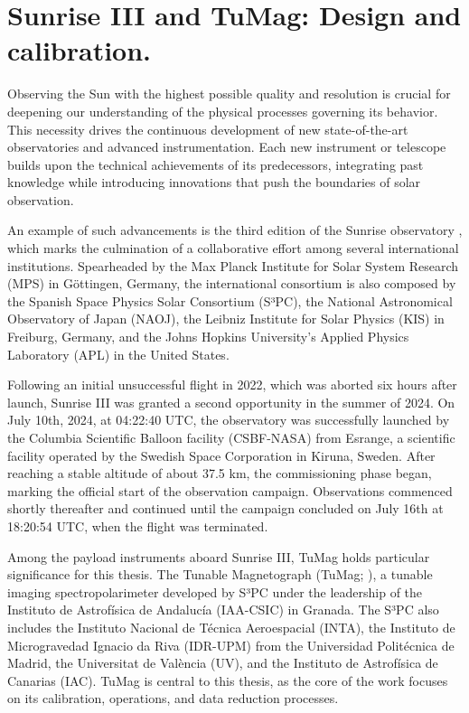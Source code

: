 \chapter{Sunrise III and TuMag: Design and calibration.}

Observing the Sun with the highest possible quality and resolution is crucial for deepening our understanding of the physical processes governing its behavior. This necessity drives the continuous development of new state-of-the-art observatories and advanced instrumentation. Each new instrument or telescope builds upon the technical achievements of its predecessors, integrating past knowledge while introducing innovations that push the boundaries of solar observation. 

An example of such advancements is the third edition of the Sunrise observatory \citep{SunriseIII}, which marks the culmination of a collaborative effort among several international institutions. Spearheaded by the Max Planck Institute for Solar System Research (MPS) in Göttingen, Germany, the international consortium is also composed by the Spanish Space Physics Solar Consortium (S³PC), the National Astronomical Observatory of Japan (NAOJ), the Leibniz Institute for Solar Physics (KIS) in Freiburg, Germany, and the Johns Hopkins University's Applied Physics Laboratory (APL) in the United States. 

Following an initial unsuccessful flight in 2022, which was aborted six hours after launch, Sunrise III was granted a second opportunity in the summer of 2024. On July 10th, 2024, at 04:22:40 UTC, the observatory was successfully launched by the Columbia Scientific Balloon facility (CSBF-NASA) from Esrange, a scientific facility operated by the Swedish Space Corporation in Kiruna, Sweden. After reaching a stable altitude of about 37.5 km, the commissioning phase began, marking the official start of the observation campaign. Observations commenced shortly thereafter and continued until the campaign concluded on July 16th at 18:20:54 UTC, when the flight was terminated.

Among the payload instruments aboard Sunrise III, TuMag holds particular significance for this thesis. The Tunable Magnetograph (TuMag; \citealt{tumag}), a tunable imaging spectropolarimeter developed by S³PC under the leadership of the Instituto de Astrofísica de Andalucía (IAA-CSIC) in Granada. The S³PC also includes the Instituto Nacional de Técnica Aeroespacial (INTA), the Instituto de Microgravedad Ignacio da Riva (IDR-UPM) from the Universidad Politécnica de Madrid, the Universitat de València (UV), and the Instituto de Astrofísica de Canarias (IAC). TuMag is central to this thesis, as the core of the work focuses on its calibration, operations, and data reduction processes.

